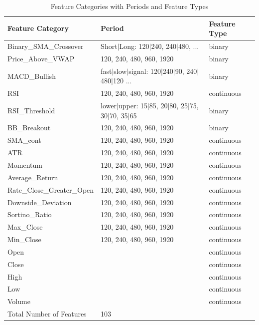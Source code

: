 \documentclass[11pt]{article}
\begin{document}
\begin{table}[h!]
    \centering
    \begin{tabular}{|l|l|l|}
    \hline
    \textbf{Feature Category} & \textbf{Period} & \textbf{Feature Type} \\ \hline
    Binary\_SMA\_Crossover & Short$|$Long: 120$|$240, 240$|$480, 
                            ...%
                            & binary \\ \hline
    Price\_Above\_VWAP & 120, 240, 480, 960, 1920 & binary \\ \hline
    MACD\_Bullish & fast$|$slow$|$signal: 120$|$240$|$90, 240$|$480$|$120
                ...%
                & binary \\ \hline
    RSI & 120, 240, 480, 960, 1920 & continuous \\ \hline
    RSI\_Threshold & lower$|$upper: 15$|$85, 20$|$80, 25$|$75, 30$|$70, 35$|$65 & binary \\ \hline
    BB\_Breakout & 120, 240, 480, 960, 1920 & binary \\ \hline
    SMA\_cont & 120, 240, 480, 960, 1920 & continuous \\ \hline
    ATR & 120, 240, 480, 960, 1920 & continuous \\ \hline
    Momentum & 120, 240, 480, 960, 1920 & continuous \\ \hline
    Average\_Return & 120, 240, 480, 960, 1920 & continuous \\ \hline
    Rate\_Close\_Greater\_Open & 120, 240, 480, 960, 1920 & continuous \\ \hline
    Downside\_Deviation & 120, 240, 480, 960, 1920 & continuous \\ \hline
    Sortino\_Ratio & 120, 240, 480, 960, 1920 & continuous \\ \hline
    Max\_Close & 120, 240, 480, 960, 1920 & continuous \\ \hline
    Min\_Close & 120, 240, 480, 960, 1920 & continuous \\ \hline
    Open &  & continuous \\ \hline
    Close &  & continuous \\ \hline
    High &  & continuous \\ \hline
    Low &  & continuous \\ \hline
    Volume &  & continuous \\ \hline
    Total Number of Features & 103 &  \\ \hline
    \end{tabular}
    \caption{Feature Categories with Periods and Feature Types}
    \label{tab:features}
\end{table}
\newpage
\end{document}
